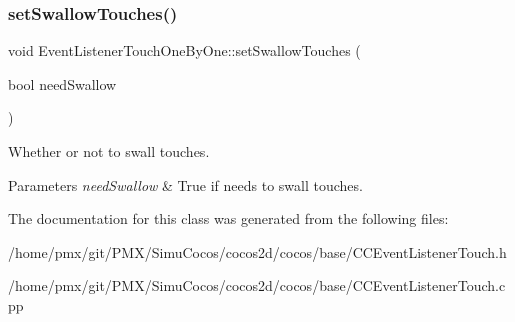 \subsubsection{\texorpdfstring{set\+Swallow\+Touches()}{setSwallowTouches()}\hspace{0.1cm}{\footnotesize\ttfamily [2/2]}}
{\footnotesize\ttfamily void Event\+Listener\+Touch\+One\+By\+One\+::set\+Swallow\+Touches (\begin{DoxyParamCaption}\item[{bool}]{need\+Swallow }\end{DoxyParamCaption})}

Whether or not to swall touches.


\begin{DoxyParams}{Parameters}
{\em need\+Swallow} & True if needs to swall touches. \\
\hline
\end{DoxyParams}


The documentation for this class was generated from the following files\+:\begin{DoxyCompactItemize}
\item 
/home/pmx/git/\+P\+M\+X/\+Simu\+Cocos/cocos2d/cocos/base/C\+C\+Event\+Listener\+Touch.\+h\item 
/home/pmx/git/\+P\+M\+X/\+Simu\+Cocos/cocos2d/cocos/base/C\+C\+Event\+Listener\+Touch.\+cpp\end{DoxyCompactItemize}
